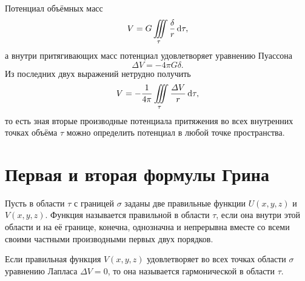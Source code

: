 \documentclass[11pt, a4paper]{article}
\theoremstyle{plain}
\theoremstyle{definition}
\theoremstyle{remark}
\begin{document}
Потенциал объёмных масс
\begin{equation}
    V = G\iiint\limits_\tau \dfrac{\delta}{r}\dif \tau,
\end{equation}
а внутри притягивающих масс потенциал удовлетворяет уравнению Пуассона
\begin{equation}
    \label{eq:poisson}
    \Delta V = -4\pi G\delta.
\end{equation}
Из последних двух выражений нетрудно получить
\begin{equation}
    \label{eq:poissonvol}
    V = -\dfrac{1}{4\pi}\iiint\limits_\tau \dfrac{\Delta V}{r} \dif\tau,
\end{equation}
то есть зная вторые производные потенциала притяжения во всех внутренних точках объёма $\tau$ можно
определить потенциал в любой точке пространства.

\section{Первая и вторая формулы Грина}
Пусть в области $\tau$ с границей $\sigma$ заданы две правильные функции $U\left( x, y, z \right)$ и
$V \left( x, y, z \right)$. Функция называется правильной в области $\tau$, если она внутри этой
области и на её границе, конечна, однозначна и непрерывна вместе со всеми своими частными
производными первых двух порядков. \par

Если правильная функция $V \left( x, y, z \right)$ удовлетворяет во всех точках области $\sigma$
уравнению Лапласа $\Delta V = 0$, то она называется гармонической в области $\tau$. 
\end{document}
